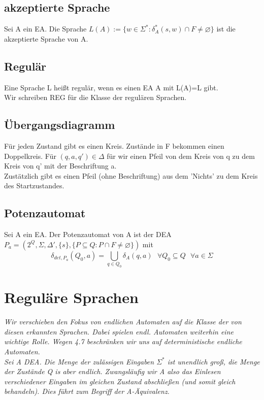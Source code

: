 \documentclass[DIV=15]{scrartcl}
\begin{document}
    \subsection{akzeptierte Sprache}
        Sei A ein EA. Die Sprache \(L(A):=\{w\in\Sigma^*:\delta_A^*(s,w)\cap F\neq\varnothing\}\) ist die akzeptierte Sprache von A. 
    \subsection{Regulär}
        Eine Sprache L heißt regulär, wenn es einen EA A mit L(A)=L gibt.\\
        Wir schreiben REG für die Klasse der regulären Sprachen.
    \subsection{Übergangsdiagramm}
        Für jeden Zustand gibt es einen Kreis. Zustände in F bekommen einen Doppelkreis. Für \((q,a,q')\in\Delta\) für wir 
        einen Pfeil von dem Kreis von q zu dem Kreis von q' mit der Beschriftung a.\\
        Zustätzlich gibt es einen Pfeil (ohne Beschriftung) aus dem 'Nichts' zu dem Kreis des Startzustandes.
    \subsection{Potenzautomat}
        Sei A ein EA. Der Potenzautomat von A ist der DEA \(P_a=(2^Q, \Sigma, \Delta',\{s\},\{P\subseteq Q:P\cap F\neq\varnothing\})\) mit
        \[\delta_{det,P_a}(Q_0,a)=\bigcup\limits_{q\in Q_0}\delta_A(q,a)\text{ }\forall Q_0\subseteq Q\text{ }\forall a\in\Sigma\]
\section{Reguläre Sprachen}
    \textit{Wir verschieben den Fokus von endlichen Automaten auf die Klasse der von diesen erkannten Sprachen.
    Dabei spielen endl. Automaten weiterhin eine wichtige Rolle.
    Wegen 4.7 beschränken wir uns auf deterministische endliche Automaten.\\
    Sei A DEA. Die Menge der zulässigen Eingaben \(\Sigma^*\) ist unendlich groß, 
    die Menge der Zustände Q is aber endlich. Zwangsläufig wir A also das Einlesen verschiedener 
    Eingaben im gleichen Zustand abschließen (und somit gleich behandeln). Dies führt zum Begriff
    der A-Äquivalenz.}
\end{document}
